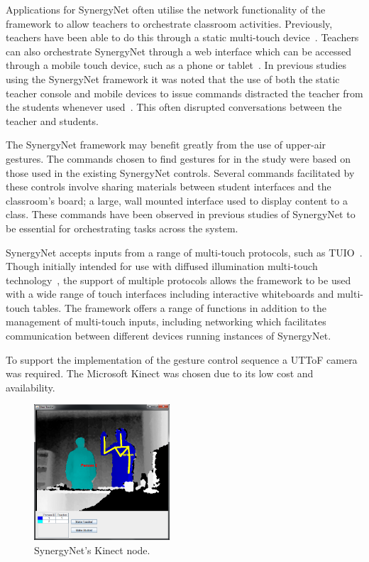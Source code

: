 \documentclass[manuscript, review, screen]{acmart}
\begin{document}
Applications for SynergyNet often utilise the network functionality of the framework to allow teachers to orchestrate classroom activities.
Previously, teachers have been able to do this through a static multi-touch device~\cite{AlAgha2010}.
Teachers can also orchestrate SynergyNet through a web interface which can be accessed through a mobile touch device, such as a phone or tablet~\cite{Mercier2013}.
In previous studies using the SynergyNet framework it was noted that the use of both the static teacher console and mobile devices to issue commands distracted the teacher from the students whenever used~\cite{Hatch2011,Mercier2013}.
This often disrupted conversations between the teacher and students.  

The SynergyNet framework may benefit greatly from the use of upper-air gestures. 
The commands chosen to find gestures for in the study were based on those used in the existing SynergyNet controls. 
Several commands facilitated by these controls involve sharing materials between student interfaces and the classroom's board; a large, wall mounted interface used to display content to a class.
These commands have been observed in previous studies of SynergyNet to be essential for orchestrating tasks across the system.

SynergyNet accepts inputs from a range of multi-touch protocols, such as TUIO~\cite{Kaltenbrunner2009}.
Though initially intended for use with diffused illumination multi-touch technology~\cite{Matsushita1997}, the support of multiple protocols allows the framework to be used with a wide range of touch interfaces including interactive whiteboards and multi-touch tables.
The framework offers a range of functions in addition to the management of multi-touch inputs, including networking which facilitates communication between different devices running instances of SynergyNet.

To support the implementation of the gesture control sequence a \ac{UTToF} camera was required.
The Microsoft Kinect was chosen due to its low cost and availability.

\begin{figure}[h]
   \centering
   \includegraphics[width=0.45\textwidth]{figures/kinect_node.png}
   \caption{SynergyNet's Kinect node.}
   \label{fig:kinectNode}
\end{figure}
\end{document}
